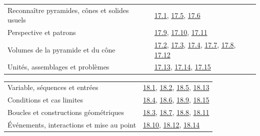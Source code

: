\begin{tabularx}{\linewidth}{@{}Yl@{}}\toprule
Reconnaître pyramides, cônes et solides usuels & \hyperref[exo-17-1]{17.1}, \hyperref[exo-17-5]{17.5}, \hyperref[exo-17-6]{17.6}\\[2mm]
Perspective et patrons & \hyperref[exo-17-9]{17.9}, \hyperref[exo-17-10]{17.10}, \hyperref[exo-17-11]{17.11}\\[2mm]
Volumes de la pyramide et du cône & \hyperref[exo-17-2]{17.2}, \hyperref[exo-17-3]{17.3}, \hyperref[exo-17-4]{17.4}, \hyperref[exo-17-7]{17.7}, \hyperref[exo-17-8]{17.8}, \hyperref[exo-17-12]{17.12}\\[2mm]
Unités, assemblages et problèmes & \hyperref[exo-17-13]{17.13}, \hyperref[exo-17-14]{17.14}, \hyperref[exo-17-15]{17.15}\\[2mm]
\bottomrule\end{tabularx}\par\vspace{4mm}
\begin{tabularx}{\linewidth}{@{}Yl@{}}\toprule
Variable, séquences et entrées & \hyperref[exo-18-1]{18.1}, \hyperref[exo-18-2]{18.2}, \hyperref[exo-18-5]{18.5}, \hyperref[exo-18-13]{18.13}\\[2mm]
Conditions et cas limites & \hyperref[exo-18-4]{18.4}, \hyperref[exo-18-6]{18.6}, \hyperref[exo-18-9]{18.9}, \hyperref[exo-18-15]{18.15}\\[2mm]
Boucles et constructions géométriques & \hyperref[exo-18-3]{18.3}, \hyperref[exo-18-7]{18.7}, \hyperref[exo-18-8]{18.8}, \hyperref[exo-18-11]{18.11}\\[2mm]
Événements, interactions et mise au point & \hyperref[exo-18-10]{18.10}, \hyperref[exo-18-12]{18.12}, \hyperref[exo-18-14]{18.14}\\[2mm]
\bottomrule\end{tabularx}\par\vspace{4mm}
\clearpage
\clearpage{}\label{matrice-objectifs}\fontsize{9.5}{12.5}\selectfont
